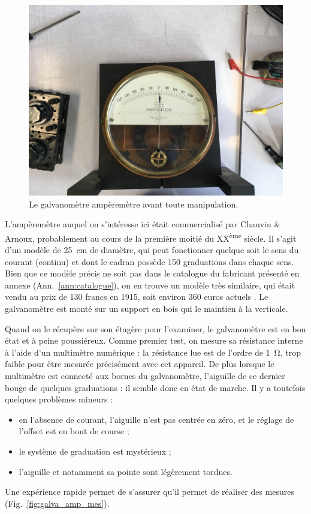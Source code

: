 \documentclass[12pt,a4paper,fleqn]{article}
\begin{document}
\begin{figure}[htbp]
    \center
    \includegraphics[height=300 pt, trim=800 0 700 800, clip]{images/IMG_4012.JPG}
    \caption{Le galvanomètre ampèremètre avant toute manipulation.}
    \label{fig:galva_amp_av}
\end{figure}

L'ampèremètre auquel on s'intéresse ici était commercialisé par Chauvin \& Arnoux, probablement au cours de la première moitié du XX\textsuperscript{ème} siècle.
Il s'agit d'un modèle de \SI{25}{cm} de diamètre, qui peut fonctionner quelque soit le sens du courant (continu) et dont le cadran possède 150 graduations dans chaque sens.
Bien que ce modèle précis ne soit pas dans le catalogue du fabricant présenté en annexe (Ann.~\ref{ann:catalogue}), on en trouve un modèle très similaire, qui était vendu au prix de 130 francs en 1915, soit environ 360 euros actuels \cite{Alexandre2014}.
Le galvanomètre est monté sur un support en bois qui le maintien à la verticale.

Quand on le récupère sur son étagère pour l'examiner, le galvanomètre est en bon état et à peine poussiéreux.
Comme premier test, on mesure sa résistance interne à l'aide d'un multimètre numérique : la résistance lue est de l'ordre de \SI{1}{\ohm}, trop faible pour être mesurée précisément avec cet appareil.
De plus lorsque le multimètre est connecté aux bornes du galvanomètre, l'aiguille de ce dernier bouge de quelques graduations : il semble donc en état de marche.
Il y a toutefois quelques problèmes mineurs :
\begin{itemize}
    \item en l'absence de courant, l'aiguille n'est pas centrée en zéro, et le réglage de l'\og offset \fg{} est en bout de course ;
    \item le système de graduation est mystérieux ;
    \item l'aiguille et notamment sa pointe sont légèrement tordues.
\end{itemize}
Une expérience rapide permet de s'assurer qu'il permet de réaliser des mesures (Fig.~\ref{fig:galva_amp_mes}).
\end{document}
